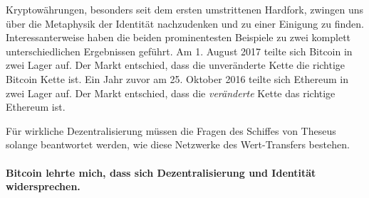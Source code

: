 Kryptowährungen, besonders seit dem ersten umstrittenen Hardfork, zwingen uns
über die Metaphysik der Identität nachzudenken und zu einer Einigung zu finden.
Interessanterweise haben die beiden prominentesten Beispiele zu zwei komplett
unterschiedlichen Ergebnissen geführt. Am 1. August 2017 teilte sich Bitcoin in
zwei Lager auf. Der Markt entschied, dass die unveränderte Kette die richtige
Bitcoin Kette ist. Ein Jahr zuvor am 25. Oktober 2016 teilte sich Ethereum in
zwei Lager auf. Der Markt entschied, dass die \textit{veränderte} Kette das
richtige Ethereum ist.

Für wirkliche Dezentralisierung müssen die Fragen des Schiffes von Theseus
solange beantwortet werden, wie diese Netzwerke des Wert-Transfers bestehen.

\paragraph{Bitcoin lehrte mich, dass sich Dezentralisierung und Identität widersprechen.}

%
%
%
%
